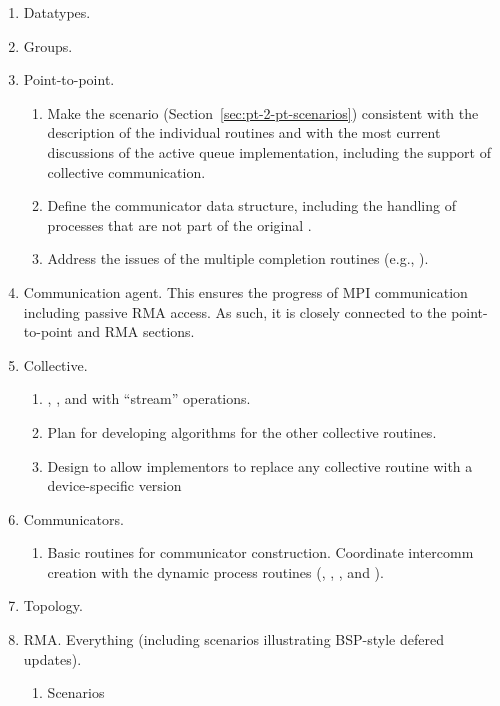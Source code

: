 \documentclass{article}
\begin{document}
\begin{enumerate}
\begin{enumerate}
  \item Datatypes.
  \item Groups.
  \item Point-to-point.  
    \begin{enumerate}
    \item Make the scenario (Section~\ref{sec:pt-2-pt-scenarios})
      consistent with the description of the individual routines and with
      the most current discussions of the active queue implementation,
      including the support of collective communication.
    \item Define the communicator data structure, including the handling
      of processes that are not part of the original
      .
    \item Address the issues of the multiple completion routines (e.g.,
      ). 
    \end{enumerate}
  \item Communication agent. 
    This ensures the progress of MPI communication including passive RMA
    access.  As such, it is closely connected to the point-to-point and RMA
    sections.  
  \item Collective.  
    \begin{enumerate}
    \item {}, , and 
      with ``stream'' operations.
    \item Plan for developing algorithms for the other collective routines.
    \item Design to allow implementors to replace any collective routine with
      a device-specific version
    \end{enumerate}
  \item Communicators.
    \begin{enumerate}
    \item Basic routines for communicator construction.  Coordinate intercomm
      creation with the dynamic process routines (,
      , , and
      ).  
    \end{enumerate}
  \item Topology.
  \item RMA.  Everything (including scenarios illustrating BSP-style defered
    updates).  
  \begin{enumerate}
    \item Scenarios
  \end{enumerate}

\end{enumerate}
\end{enumerate}
\end{document}
